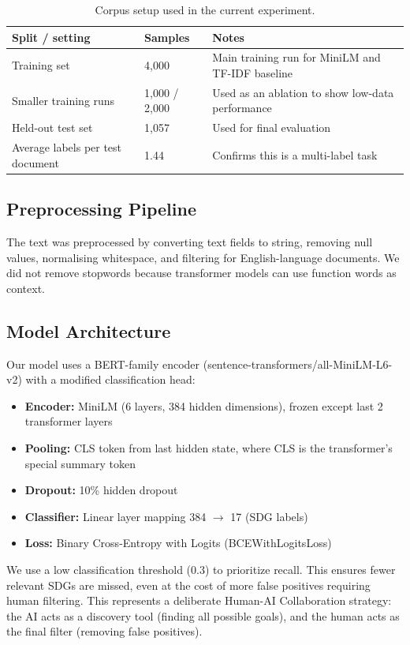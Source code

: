 \documentclass[12pt,a4paper]{article}
\begin{document}
\begin{table}[htbp]
\centering
\caption{Corpus setup used in the current experiment.}
\begin{tabular}{llp{5.5cm}}
\toprule
Split / setting & Samples & Notes \\
\midrule
Training set & 4,000 & Main training run for MiniLM and TF-IDF baseline \\
Smaller training runs & 1,000 / 2,000 & Used as an ablation to show low-data performance \\
Held-out test set & 1,057 & Used for final evaluation \\
Average labels per test document & 1.44 & Confirms this is a multi-label task \\
\bottomrule
\end{tabular}
\end{table}

\subsection{Preprocessing Pipeline}

The text was preprocessed by converting text fields to string, removing null values, normalising whitespace, and filtering for English-language documents. We did not remove stopwords because transformer models can use function words as context.

\subsection{Model Architecture}

Our model uses a BERT-family encoder (sentence-transformers/all-MiniLM-L6-v2) with a modified classification head:

\begin{itemize}
\item \textbf{Encoder:} MiniLM (6 layers, 384 hidden dimensions), frozen except last 2 transformer layers
\item \textbf{Pooling:} CLS token from last hidden state, where CLS is the transformer's special summary token
\item \textbf{Dropout:} 10\% hidden dropout
\item \textbf{Classifier:} Linear layer mapping 384 $\to$ 17 (SDG labels)
\item \textbf{Loss:} Binary Cross-Entropy with Logits (BCEWithLogitsLoss)
\end{itemize}

We use a low classification threshold (0.3) to prioritize recall. This ensures fewer relevant SDGs are missed, even at the cost of more false positives requiring human filtering. This represents a deliberate Human-AI Collaboration strategy: the AI acts as a discovery tool (finding all possible goals), and the human acts as the final filter (removing false positives).
\end{document}
